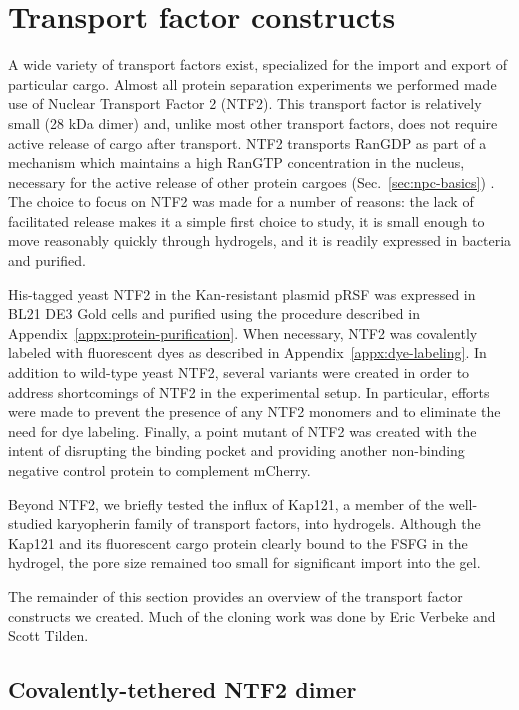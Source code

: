 \section{Transport factor constructs}

A wide variety of transport factors exist, specialized for the import and export of particular cargo.  Almost all protein separation experiments we performed made use of Nuclear Transport Factor 2 (NTF2).  This transport factor is relatively small (28 kDa dimer) and, unlike most other transport factors, does not require active release of cargo after transport. NTF2 transports RanGDP as part of a mechanism which maintains a high RanGTP concentration in the nucleus, necessary for the active release of other protein cargoes (Sec.~\ref{sec:npc-basics}) \cite{ribbeck98}.  The choice to focus on NTF2 was made for a number of reasons: the lack of facilitated release makes it a simple first choice to study, it is small enough to move reasonably quickly through hydrogels, and it is readily expressed in bacteria and purified.

His-tagged yeast NTF2 in the Kan-resistant plasmid pRSF was expressed in BL21 DE3 Gold cells and purified using the procedure described in Appendix~\ref{appx:protein-purification}.  When necessary, NTF2 was covalently labeled with fluorescent dyes as described in Appendix~\ref{appx:dye-labeling}.  In addition to wild-type yeast NTF2, several variants were created in order to address shortcomings of NTF2 in the experimental setup.  In particular, efforts were made to prevent the presence of any NTF2 monomers and to eliminate the need for dye labeling.  Finally, a point mutant of NTF2 was created with the intent of disrupting the binding pocket and providing another non-binding negative control protein to complement mCherry.

Beyond NTF2, we briefly tested the influx of Kap121, a member of the well-studied karyopherin family of transport factors, into hydrogels.  Although the Kap121 and its fluorescent cargo protein clearly bound to the FSFG in the hydrogel, the pore size remained too small for significant import into the gel.

The remainder of this section provides an overview of the transport factor constructs we created.  Much of the cloning work was done by Eric Verbeke and Scott Tilden.

\subsection{Covalently-tethered NTF2 dimer}

